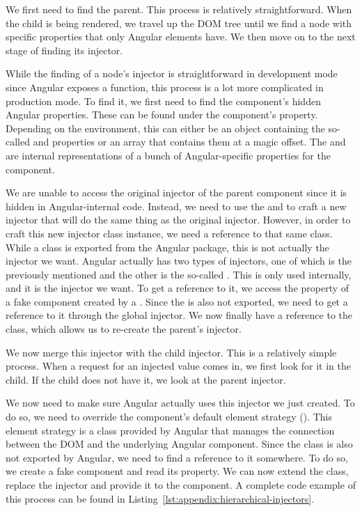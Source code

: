 {  We first need to find the parent. This process is relatively straightforward. When the child is being rendered, we travel up the DOM tree until we find a node with specific properties that only Angular elements have. We then move on to the next stage of finding its injector.

  While the finding of a node's injector is straightforward in development mode since Angular exposes a  function, this process is a lot more complicated in production mode. To find it, we first need to find the component's hidden Angular properties. These can be found under the component's  property. Depending on the environment, this can either be an object containing the so-called  and  properties or an array that contains them at a magic offset. The  and  are internal representations of a bunch of Angular-specific properties for the component.

  We are unable to access the original injector of the parent component since it is hidden in Angular-internal code. Instead, we need to use the  and  to craft a new injector that will do the same thing as the original injector. However, in order to craft this new injector class instance, we need a reference to that same class. While a  class is exported from the Angular package, this is not actually the injector we want. Angular actually has two types of injectors, one of which is the previously mentioned  and the other is the so-called . This  is only used internally, and it is the injector we want. To get a reference to it, we access the  property of a fake component created by a . Since the  is also not exported, we need to get a reference to it through the global injector. We now finally have a reference to the  class, which allows us to re-create the parent's injector.

  We now merge this injector with the child injector. This is a relatively simple process. When a request for an injected value comes in, we first look for it in the child. If the child does not have it, we look at the parent injector.

  We now need to make sure Angular actually uses this injector we just created. To do so, we need to override the component's default element strategy (). This element strategy is a class provided by Angular that manages the connection between the DOM and the underlying Angular component. Since the  class is also not exported by Angular, we need to find a reference to it somewhere. To do so, we create a fake component and read its  property. We can now extend the class, replace the injector and provide it to the component. A complete code example of this process can be found in Listing~\ref{lst:appendix:hierarchical-injectors}.

}
